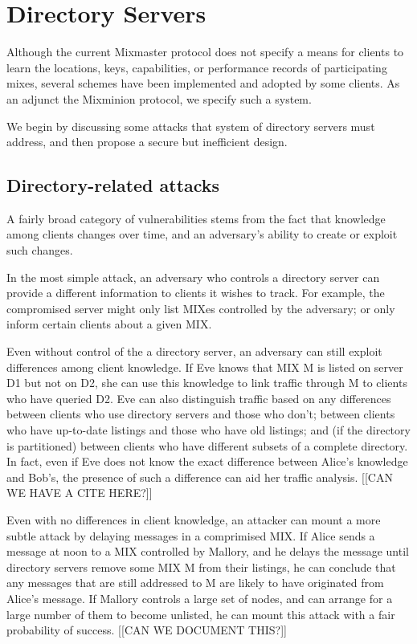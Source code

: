 \documentclass{llncs}
\begin{document}
{%

\section{Directory Servers}
\label{sec:dir-servers}

Although the current Mixmaster protocol does not specify a means for
clients to learn the locations, keys, capabilities, or performance
records of participating mixes, several schemes have been implemented
\cite{mix-stats} and adopted by some clients.  As an adjunct the
Mixminion protocol, we specify such a system.

We begin by discussing some attacks that system of directory servers
must address, and then propose a secure but inefficient design.

\subsection{Directory-related attacks}
\label{subsec:dir-server-attacks}

A fairly broad category of vulnerabilities stems from the fact that
knowledge among clients changes over time, and an adversary's ability
to create or exploit such changes.

In the most simple attack, an adversary who controls a directory
server can provide a different information to clients it wishes to
track.  For example, the compromised server might only list MIXes
controlled by the adversary; or only inform certain clients about a
given MIX. 

Even without control of the a directory server, an adversary can still
exploit differences among client knowledge.  If Eve knows that MIX M
is listed on server D1 but not on D2, she can use this knowledge to
link traffic through M to clients who have queried D2.  Eve can also
distinguish traffic based on any differences between clients who use
directory servers and those who don't; between clients who have
up-to-date listings and those who have old listings; and (if the
directory is partitioned) between clients who have different subsets
of a complete directory.  In fact, even if Eve does not know the exact
difference between Alice's knowledge and Bob's, the presence of such a
difference can aid her traffic analysis. [[CAN WE HAVE A CITE HERE?]]

Even with no differences in client knowledge, an attacker can mount a
more subtle attack by delaying messages in a comprimised MIX.  If
Alice sends a message at noon to a MIX controlled by Mallory, and he
delays the message until directory servers remove some MIX M from
their listings, he can conclude that any messages that are still
addressed to M are likely to have originated from Alice's message.  If
Mallory controls a large set of nodes, and can arrange for a large
number of them to become unlisted, he can mount this attack with a
fair probability of success. [[CAN WE DOCUMENT THIS?]]

}
\end{document}
